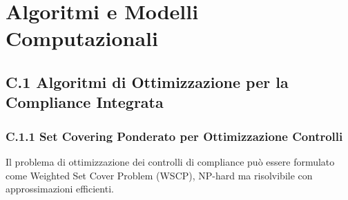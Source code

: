 
\chapter{Algoritmi e Modelli Computazionali}

\section{C.1 Algoritmi di Ottimizzazione per la Compliance Integrata}

\subsection{C.1.1 Set Covering Ponderato per Ottimizzazione Controlli}

Il problema di ottimizzazione dei controlli di compliance può essere formulato come Weighted Set Cover Problem (WSCP), NP-hard ma risolvibile con approssimazioni efficienti.

